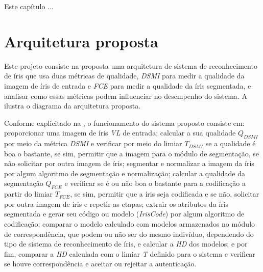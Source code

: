 
\par Este capítulo ...


\section{Arquitetura proposta} \label{sec:metodologia:arquitetura}

\par Este projeto consiste na proposta uma arquitetura de sistema de reconhecimento de íris que usa duas métricas de qualidade, \textit{\acrfull{DSMI}} para medir a qualidade da imagem de íris de entrada e \textit{\acrfull{FCE}} para medir a qualidade da íris segmentada, e analisar como essas métricas podem influenciar no desempenho do sistema. A  ilustra o diagrama da arquitetura proposta.


\par Conforme explicitado na , o funcionamento do sistema proposto consiste em: proporcionar uma imagem de íris \textit{\acrfull{VL}} de entrada; calcular a sua qualidade $Q_{DSMI}$ por meio da métrica \textit{\acrshort{DSMI}} e verificar por meio do limiar $T_{DSMI}$ se a qualidade é boa o bastante, se sim, permitir que a imagem para o módulo de segmentação, se não solicitar por outra imagem de íris; segmentar e normalizar a imagem da íris por algum algoritmo de segmentação e normalização; calcular a qualidade da segmentação $Q_{FCE}$ e verificar se é ou não boa o bastante para a codificação a partir do limiar $T_{FCE}$, se sim, permitir que a íris seja codificada e se não, solicitar por outra imagem de íris e repetir as etapas; extrair os atributos da íris segmentada e gerar seu código ou modelo (\textit{IrisCode}) por algum algoritmo de codificação; comparar o modelo calculado com modelos armazenados no módulo de correspondência, que podem ou não ser do mesmo indivíduo, dependendo do tipo de sistema de reconhecimento de íris, e calcular a \textit{\acrfull{HD}} dos modelos; e por fim, comparar a \textit{\acrshort{HD}} calculada com o limiar \textit{T} definido para o sistema e verificar se houve correspondência e aceitar ou rejeitar a autenticação.

